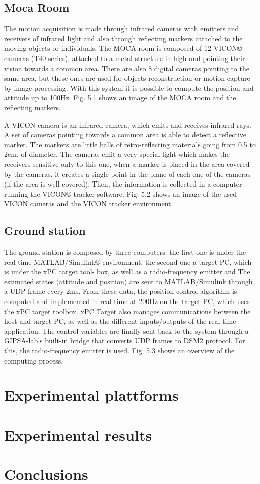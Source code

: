 \subsection{Moca Room}

The motion acquisition is made through infrared cameras with emitters and receivers
of infrared light and also through reflecting markers attached to the moving objects or
individuals. The MOCA room is composed of 12 VICON© cameras (T40 series), attached
to a metal structure in high and pointing their vision towards a common area. There are
also 8 digital cameras pointing to the same area, but these ones are used for objects
reconstruction or motion capture by image processing. With this system it is possible to
compute the position and attitude up to 100Hz. Fig. 5.1 shows an image of the MOCA
room and the reflecting markers.

A VICON camera is an infrared camera, which emits and receives infrared rays. A
set of cameras pointing towards a common area is able to detect a reflective marker. The
markers are little balls of retro-reflecting materials going from 0.5 to 2cm. of diameter.
The cameras emit a very special light which makes the receivers sensitive only to this one,
when a marker is placed in the area covered by the cameras, it creates a single point in
the plane of each one of the cameras (if the area is well covered). Then, the information is
collected in a computer running the VICON© tracker software. Fig. 5.2 shows an image
of the used VICON cameras and the VICON tracker environment.


\subsection{Ground station}

The ground station is composed by three computers: the first one is under the real time
MATLAB/Simulink© environment, the second one a target PC, which is under the xPC target tool-
box, as well as a radio-frequency emitter and
The estimated states (attitude and position) are sent to MATLAB/Simulink through
a UDP frame every 2ms. From these data, the position control algorithm is computed and
implemented in real-time at 200Hz on the target PC, which uses the xPC target toolbox.
xPC Target also manages communications between the host and target PC, as well as the
different inputs/outputs of the real-time application.
The control variables are finally sent back to the system through a GIPSA-lab’s built-in
bridge that converts UDP frames to DSM2 protocol. For this, the radio-frequency emitter
is used. Fig. 5.3 shows an overview of the computing process.

\section{Experimental plattforms}
\section{Experimental results}

\section{Conclusions}
